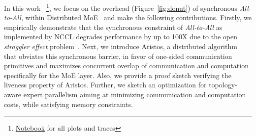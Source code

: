 In this work
~\footnote{\href{https://github.com/osayamenja/DataCruncher}{Notebook} for all plots and traces},
we focus on the overhead (Figure~\ref{fig:donut}) of synchronous \emph{All-to-All},
within Distributed MoE~\cite{DBLP:journals/corr/abs-2006-16668}
and make the following contributions.
Firstly, we empirically demonstrate that the synchronous constraint of \emph{All-to-All}
as implemented by NCCL degrades performance by up to 100X due to
the open \emph{straggler effect} problem~\cite{10.1145/2987550.2987554}.
Next, we introduce Aristos, a distributed algorithm
that obviates this synchronous barrier, in favor of one-sided communication primitives and maximizes
concurrent overlap of communication and computation specifically for the MoE layer.
Also, we provide a proof sketch verifying the liveness property of Aristos.
Further, we sketch an optimization for topology-aware expert parallelism
aiming at minimizing communication and computation costs,
while satisfying memory constraints.
   
